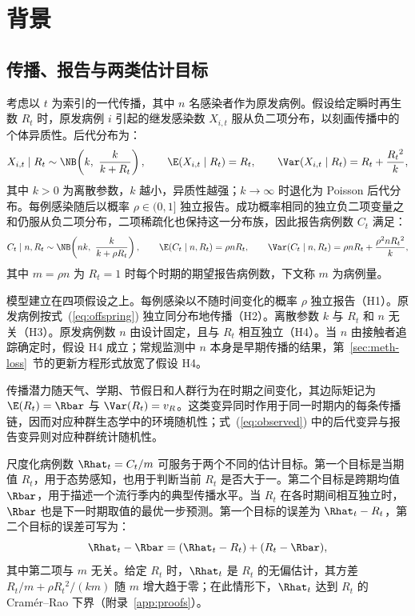 \section{背景}
\label{sec:background}

\subsection{传播、报告与两类估计目标}
\label{sec:bg-model}

考虑以 $t$ 为索引的一代传播，其中 $n$ 名感染者作为原发病例。假设给定瞬时再生数 $R_t$ 时，原发病例 $i$ 引起的继发感染数 $X_{i,t}$ 服从负二项分布，以刻画传播中的个体异质性\citep{lloydsmith2005superspreading}。后代分布为：
\begin{equation}
  X_{i,t}\mid R_t \sim \NB\!\left(k,\ \frac{k}{k+R_t}\right),\qquad %
  \E(X_{i,t}\mid R_t)=R_t,\qquad \Var(X_{i,t}\mid R_t)=R_t+\frac{R_t{}^2}{k}, %
  \label{eq:offspring}
\end{equation}
其中 $k>0$ 为离散参数，$k$ 越小，异质性越强；$k\to\infty$ 时退化为 Poisson 后代分布。每例感染随后以概率 $\rho\in(0,1]$ 独立报告。成功概率相同的独立负二项变量之和仍服从负二项分布，二项稀疏化也保持这一分布族，因此报告病例数 $C_t$ 满足：
\begin{equation}
  C_t\mid n,R_t \sim \NB\!\left(nk,\ \frac{k}{k+\rho R_t}\right),\qquad %
  \E(C_t\mid n,R_t)=\rho nR_t,\qquad %
  \Var(C_t\mid n,R_t)=\rho nR_t+\frac{\rho^2nR_t{}^2}{k},
  \label{eq:observed}
\end{equation}
其中 $m=\rho n$ 为 $R_t=1$ 时每个时期的期望报告病例数，下文称 $m$ 为病例量。

模型建立在四项假设之上。每例感染以不随时间变化的概率 $\rho$ 独立报告（H1）。原发病例按式~(\ref{eq:offspring}) 独立同分布地传播（H2）。离散参数 $k$ 与 $R_t$ 和 $n$ 无关（H3）。原发病例数 $n$ 由设计固定，且与 $R_t$ 相互独立（H4）。当 $n$ 由接触者追踪确定时，假设 H4 成立；常规监测中 $n$ 本身是早期传播的结果，第~\ref{sec:meth-loss}~节的更新方程形式放宽了假设 H4。

传播潜力随天气、学期、节假日和人群行为在时期之间变化\citep{dalziel2018urbanization}，其边际矩记为 $\E(R_t)=\Rbar$ 与 $\Var(R_t)=v_R$。这类变异同时作用于同一时期内的每条传播链，因而对应种群生态学中的环境随机性；式~(\ref{eq:observed}) 中的后代变异与报告变异则对应种群统计随机性\citep{engen1998demographic, lande2003stochastic}。

尺度化病例数 $\Rhat_t=C_t/m$ 可服务于两个不同的估计目标。第一个目标是当期值 $R_t$，用于态势感知，也用于判断当前 $R_t$ 是否大于一。第二个目标是跨期均值 $\Rbar$，用于描述一个流行季内的典型传播水平。当 $R_t$ 在各时期间相互独立时，$\Rbar$ 也是下一时期取值的最优一步预测。第一个目标的误差为 $\Rhat_t-R_t$，第二个目标的误差可写为：
\begin{equation}
  \Rhat_t-\Rbar=(\Rhat_t-R_t)+(R_t-\Rbar),
  \label{eq:error-split}
\end{equation}
其中第二项与 $m$ 无关。给定 $R_t$ 时，$\Rhat_t$ 是 $R_t$ 的无偏估计，其方差 $R_t/m+\rho R_t{}^2/(km)$ 随 $m$ 增大趋于零；在此情形下，$\Rhat_t$ 达到 $R_t$ 的 Cram\'er--Rao 下界（附录~\ref{app:proofs}）。

